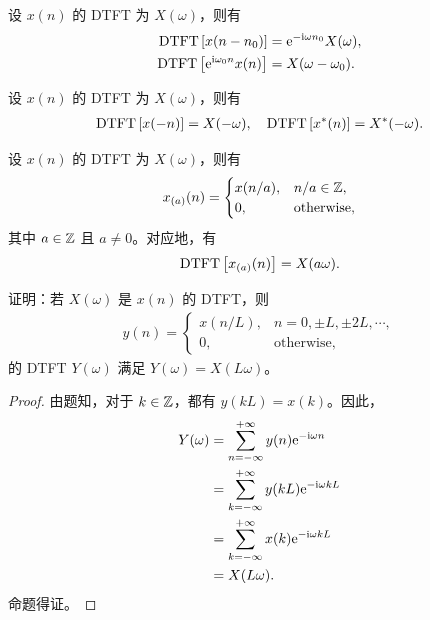 \begin{property}
    设 $x(n)$ 的 DTFT 为 $X(\omega)$，则有
    \begin{align*}
        \mathrm{DTFT}\left[x(n - n_0)\right] & = \mathrm{e}^{-\mathrm{i}\omega n_0}X(\omega), \\
        \mathrm{DTFT}\left[\mathrm{e}^{\mathrm{i}\omega_0 n}x(n)\right] & = X(\omega - \omega_0).
    \end{align*}
\end{property}

\begin{property}
    设 $x(n)$ 的 DTFT 为 $X(\omega)$，则有
    \begin{align*}
        \mathrm{DTFT}\left[x(-n)\right] = X(-\omega), \quad \mathrm{DTFT}\left[x^*(n)\right] = X^*(-\omega).
    \end{align*}
\end{property}

\begin{property}
    设 $x(n)$ 的 DTFT 为 $X(\omega)$，则有
    \begin{align*}
        x_{(a)}(n) = \begin{cases}
            x(n/a), & n/a \in \mathbb{Z}, \\
            0, & \text{otherwise},
        \end{cases}
    \end{align*}
    其中 $a \in \mathbb{Z}$ 且 $a \neq 0$。对应地，有
    \begin{align*}
        \mathrm{DTFT}\left[x_{(a)}(n)\right] = X(a\omega).
    \end{align*}
\end{property}

\begin{exercise}
    证明：若 $X(\omega)$ 是 $x(n)$ 的 DTFT，则
    \begin{align*}
        y(n) = \begin{cases}
            x(n / L), & n = 0, \pm L, \pm 2L, \cdots, \\
            0, & \text{otherwise},
        \end{cases}
    \end{align*}
    的 DTFT $Y(\omega)$ 满足 $Y(\omega) = X(L \omega)$。
\end{exercise}

\begin{proof}
    由题知，对于 $k \in \mathbb{Z}$，都有 $y(kL) = x(k)$。因此，
    \begin{align*}
        Y(\omega) & = \sum_{n = -\infty}^{+\infty}y(n)\mathrm{e}^{-\mathrm{i}\omega n} \\
        & = \sum_{k = -\infty}^{+\infty}y(k L)\mathrm{e}^{-\mathrm{i}\omega kL} \\
        & = \sum_{k = -\infty}^{+\infty}x(k)\mathrm{e}^{-\mathrm{i}\omega kL} \\
        & = X(L\omega).
    \end{align*}
    命题得证。
\end{proof}

